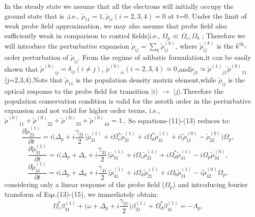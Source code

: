 \documentclass[12pt,a4paper]{article}
\begin{document}
In the steady state we assume that all the electrons will initially occupy the ground state that is ,i.e., $\tilde\rho_{11} = 1, \tilde\rho_{ii}{(i=2,3,4)}=0$ at t=0. Under the limit of weak probe field approximation, we may also assume that probe field also sufficiently weak in comparison to control fields[i.e., $\Omega_p \ll \Omega_c,\Omega_b$ ; Therefore we will introduce the perturbative expansion $\tilde\rho_{ij} = \sum\limits_{k} \tilde\rho^{(k)}_{ij}$, where $\tilde\rho^{(k)}_{ij}$ is the \(k^{\text{th}}\)-order perturbation of ${\tilde\rho}_{ij}$. From the regime of adibatic formulation,it can be easily shown that ${{\tilde\rho}^{(0)}}_{ij}=\delta_{ij}(i\neq j)$, ${{\tilde\rho}^{(0)}}_{ii}(i=2,3,4)\simeq0$,and$\tilde\rho_{j1}\simeq{{\tilde\rho}^{(1)}}_{j1}{{\tilde\rho}^{(0)}}_{11}$(j=2,3,4).Note that $\tilde\rho_{11}$ is the population density matrix element,while $\tilde\rho_{ij}$ is the optical response to the probe field for transition $|i\rangle$ $\rightarrow$ $|j\rangle$.Therefore the population conservation condition is valid for the zeroth order in the perturbative expansion and not valid for higher order terms, i.e., \({{\tilde\rho}^{(0)}}_{11}+{{\tilde\rho}^{(0)}}_{22}+{{\tilde\rho}^{(0)}}_{33}+{{\tilde\rho}^{(0)}}_{44}=1.\). So equations-(11)-(13) reduces to:
\begin{equation}
    \frac{\partial\tilde\rho_{21}^{(1)}}{\partial t} = i\big(\Delta_p+i\frac{\gamma_{21}}{2}\big)\tilde{\rho}_{21}^{(1)}+i\Omega_c^*\tilde{\rho}_{31}^{(1)}+i\Omega_d^*\tilde{\rho}_{41}^{(1)}+i\big(\tilde{\rho}_{11}^{(0)}-\tilde{\rho}_{22}^{(0)}\big)\Omega_p,
\end{equation}
\begin{equation}
    \frac{\partial\tilde{\rho}_{31}^{(1)}}{\partial t}=i\big(\Delta_p+\Delta_c+i\frac{\gamma_{31}}{2}\big)\tilde{\rho}_{31}^{(1)}+i\Omega_c\tilde{\rho}_{21}^{(1)}+i\Omega_d^*\tilde{\rho}_{41}^{(1)}-i\Omega_p\tilde{\rho}_{34}^{(0)},
\end{equation}
\begin{equation}
    \frac{\partial\tilde{\rho}_{41}^{(1)}}{\partial t}=i\big(\Delta_p+\Delta_d+i\frac{\gamma_{41}}{2}\big)\tilde{\rho}_{41}^{(1)}+i\Omega_d\tilde{\rho}_{21}^{(1)}+i\Omega_b\tilde{\rho}_{31}^{(1)}-i\tilde{\rho}_{42}^{(0)}\Omega_p,
\end{equation}
considering only a linear response of the probe field ($\Omega_p$) and introducing fourier transform of Eqs.(13)-(15), we immediately obtain:
\begin{equation}
    \Omega_c^*\beta_{31}^{(1)}+\big(\omega+\Delta_p+i\frac{\gamma_{21}}{2}\big)\beta_{21}^{(1)}+\Omega_d^*\beta_{41}^{(1)}=-\Lambda_p,
\end{equation}
\end{document}

